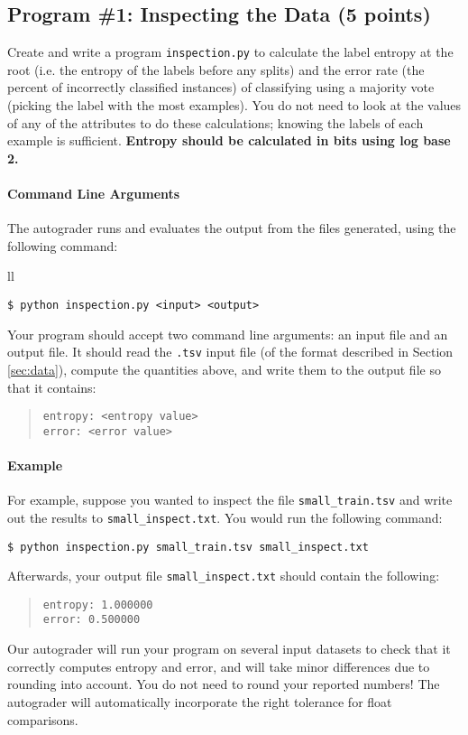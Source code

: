 \documentclass[11pt,addpoints,answers]{exam}
\begin{document}
\subsection{Program \#1: Inspecting the Data (5 points)}
\label{sec:inspect}

    Create and write a program \texttt{inspection.py} to calculate the label entropy at the root (i.e. the entropy of the labels before any splits) and the error rate (the percent of incorrectly classified instances) of classifying using a majority vote (picking the label with the most examples). You do not need to look at the values of any of the attributes to do these calculations; knowing the labels of each example is sufficient. \textbf{Entropy should be calculated in bits using log base 2.}

\paragraph{Command Line Arguments}
The autograder runs and evaluates the output from the files  generated, using the following command:

\begin{tabular}{ll}
\begin{lstlisting}[language=Shell]
$ python inspection.py <input> <output>
\end{lstlisting}
\end{tabular}

Your program should accept two command line arguments: an input file and an output file. It should read the \lstinline{.tsv} input file (of the format described in Section \ref{sec:data}), compute the quantities above, and write them to the output file so that it contains:
\begin{quote}
\begin{verbatim}
entropy: <entropy value>
error: <error value>
\end{verbatim}
\end{quote}

\paragraph{Example}

For example, suppose you wanted to inspect the file \lstinline{small_train.tsv} and write out the results to \lstinline{small_inspect.txt}. You would run the following command:
%
\begin{lstlisting}[language=Shell]
$ python inspection.py small_train.tsv small_inspect.txt
\end{lstlisting}
%
Afterwards, your output file \lstinline{small_inspect.txt} should contain the following:
%
\begin{quote}
\begin{verbatim}
entropy: 1.000000
error: 0.500000
\end{verbatim}
\end{quote}
%
Our autograder will run your program on several input datasets to check that it correctly computes entropy and error, and will take minor differences due to rounding into account. You do not need to round your reported numbers! The autograder will automatically incorporate the right tolerance for float comparisons.
\end{document}
